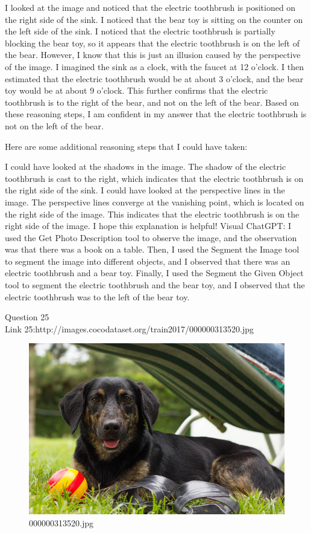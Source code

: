 \begin{enumerate}
        I looked at the image and noticed that the electric toothbrush is positioned on the right side of the sink.
        I noticed that the bear toy is sitting on the counter on the left side of the sink.
        I noticed that the electric toothbrush is partially blocking the bear toy, so it appears that the electric toothbrush is on the left of the bear. However, I know that this is just an illusion caused by the perspective of the image.
        I imagined the sink as a clock, with the faucet at 12 o'clock. I then estimated that the electric toothbrush would be at about 3 o'clock, and the bear toy would be at about 9 o'clock. This further confirms that the electric toothbrush is to the right of the bear, and not on the left of the bear.
        Based on these reasoning steps, I am confident in my answer that the electric toothbrush is not on the left of the bear.
        
        Here are some additional reasoning steps that I could have taken:
        
        I could have looked at the shadows in the image. The shadow of the electric toothbrush is cast to the right, which indicates that the electric toothbrush is on the right side of the sink.
        I could have looked at the perspective lines in the image. The perspective lines converge at the vanishing point, which is located on the right side of the image. This indicates that the electric toothbrush is on the right side of the image.
        I hope this explanation is helpful!
        \subitem Visual ChatGPT: I used the Get Photo Description tool to observe the image, and the observation was that there was a book on a table. Then, I used the Segment the Image tool to segment the image into different objects, and I observed that there was an electric toothbrush and a bear toy. Finally, I used the Segment the Given Object tool to segment the electric toothbrush and the bear toy, and I observed that the electric toothbrush was to the left of the bear toy.
    \end{enumerate}
Question 25\\
Link 25:http://images.cocodataset.org/train2017/000000313520.jpg
    \begin{figure}[h]
        \centering
        \includegraphics[width=0.8\linewidth]{../image set/easy/000000313520.jpg}
        \caption{000000313520.jpg}
    \end{figure}
